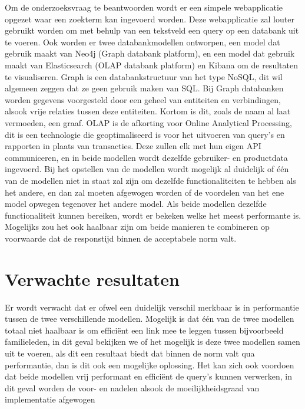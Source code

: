 Om de onderzoeksvraag te beantwoorden wordt er een simpele webapplicatie opgezet waar een zoekterm kan ingevoerd worden. Deze webapplicatie zal louter gebruikt worden om met behulp van een tekstveld een query op een databank uit te voeren. Ook worden er twee databankmodellen ontworpen, een model dat gebruik maakt van Neo4j (Graph databank platform), en een model dat gebruik maakt van Elasticsearch (OLAP databank platform) en Kibana om de resultaten te visualiseren. Graph is een databankstructuur van het type NoSQL, dit wil algemeen zeggen dat ze geen gebruik maken van SQL. Bij Graph databanken worden gegevens voorgesteld door een geheel van entiteiten en verbindingen, alsook vrije relaties tussen deze entiteiten. Kortom is dit, zoals de naam al laat vermoeden, een graaf. OLAP is de afkorting voor Online Analytical Processing, dit is een technologie die geoptimaliseerd is voor het uitvoeren van query's en rapporten in plaats van transacties. Deze zullen elk met hun eigen API communiceren, en in beide modellen wordt dezelfde gebruiker- en productdata ingevoerd. Bij het opstellen van de modellen wordt mogelijk al duidelijk of één van de modellen niet in staat zal zijn om dezelfde functionaliteiten te hebben als het andere, en dan zal moeten afgewogen worden of de voordelen van het ene model opwegen tegenover het andere model. Als beide modellen dezelfde functionaliteit kunnen bereiken, wordt er bekeken welke het meest performante is. Mogelijks zou het ook haalbaar zijn om beide manieren te combineren op voorwaarde dat de responstijd binnen de acceptabele norm valt.


\section{Verwachte resultaten}
\label{sec:verwachte_resultaten}

Er wordt verwacht dat er ofwel een duidelijk verschil merkbaar is in performantie tussen de twee verschillende modellen. Mogelijk is dat één van de twee modellen totaal niet haalbaar is om efficiënt een link mee te leggen tussen bijvoorbeeld familieleden, in dit geval bekijken we of het mogelijk is deze twee modellen samen uit te voeren, als dit een resultaat biedt dat binnen de norm valt qua performantie, dan is dit ook een mogelijke oplossing.
 Het kan zich ook voordoen dat beide modellen vrij performant en efficiënt de query's kunnen verwerken, in dit geval worden de voor- en nadelen alsook de moeilijkheidsgraad van implementatie afgewogen


